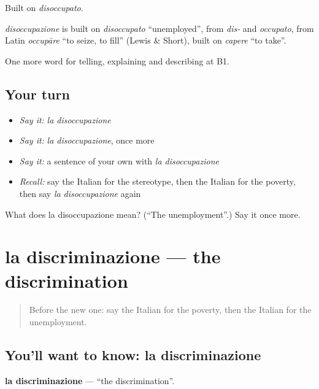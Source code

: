 Built on \emph{disoccupato}.

\begin{cousinweb}
\emph{disoccupazione} is built on \emph{disoccupato} \textquotedblleft{}unemployed\textquotedblright{}, from \emph{dis-} and \emph{occupato}, from Latin \emph{occupāre} \textquotedblleft{}to seize, to fill\textquotedblright{} (Lewis \& Short), built on \emph{capere} \textquotedblleft{}to take\textquotedblright{}.
\end{cousinweb}

\begin{grammarlens}[title={What you've built}]
One more word for telling, explaining and describing at B1.
\end{grammarlens}

\subsection*{Your turn}
\begin{itemize}
\raggedright
  \item \emph{Say it:} \emph{la disoccupazione}
  \item \emph{Say it:} \emph{la disoccupazione}, once more
  \item \emph{Say it:} a sentence of your own with \emph{la disoccupazione}
  \item \emph{Recall:} say the Italian for the stereotype, then the Italian for the poverty, then say \emph{la disoccupazione} again
\end{itemize}

\begin{tcolorbox}[breakable,colback=teal!4,colframe=teal!35!black,title={Before you move on}]
What does la disoccupazione mean? (\textquotedblleft{}The unemployment\textquotedblright{}.) Say it once more.
\end{tcolorbox}
\section[la discriminazione]{la discriminazione — the discrimination}

\label{lesson:IT-C366-discriminazione}



\begin{quote}
Before the new one: say the Italian for the poverty, then the Italian for the unemployment.
\end{quote}

\subsection*{You'll want to know: la discriminazione}
\textbf{la discriminazione} — \textquotedblleft{}the discrimination\textquotedblright{}.


